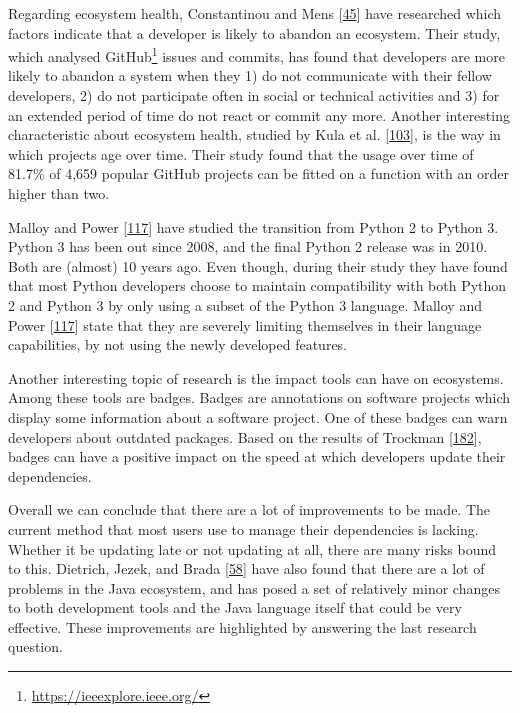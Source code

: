 \documentclass[]{book}
\let\rmarkdownfootnote\footnote%
\def\footnote{\protect\rmarkdownfootnote}
\begin{document}
Regarding ecosystem health, Constantinou and Mens
{[}\protect\hyperlink{ref-Constantinou2017}{45}{]} have researched which
factors indicate that a developer is likely to abandon an ecosystem.
Their study, which analysed GitHub\footnote{\url{https://ieeexplore.ieee.org/}}
issues and commits, has found that developers are more likely to abandon
a system when they 1) do not communicate with their fellow developers,
2) do not participate often in social or technical activities and 3) for
an extended period of time do not react or commit any more. Another
interesting characteristic about ecosystem health, studied by Kula et
al. {[}\protect\hyperlink{ref-Kula2017-2}{103}{]}, is the way in which
projects age over time. Their study found that the usage over time of
81.7\% of 4,659 popular GitHub projects can be fitted on a function with
an order higher than two.

Malloy and Power {[}\protect\hyperlink{ref-Malloy2018}{117}{]} have
studied the transition from Python 2 to Python 3. Python 3 has been out
since 2008, and the final Python 2 release was in 2010. Both are
(almost) 10 years ago. Even though, during their study they have found
that most Python developers choose to maintain compatibility with both
Python 2 and Python 3 by only using a subset of the Python 3 language.
Malloy and Power {[}\protect\hyperlink{ref-Malloy2018}{117}{]} state
that they are severely limiting themselves in their language
capabilities, by not using the newly developed features.

Another interesting topic of research is the impact tools can have on
ecosystems. Among these tools are badges. Badges are annotations on
software projects which display some information about a software
project. One of these badges can warn developers about outdated
packages. Based on the results of Trockman
{[}\protect\hyperlink{ref-Trockman2018}{182}{]}, badges can have a
positive impact on the speed at which developers update their
dependencies.

Overall we can conclude that there are a lot of improvements to be made.
The current method that most users use to manage their dependencies is
lacking. Whether it be updating late or not updating at all, there are
many risks bound to this. Dietrich, Jezek, and Brada
{[}\protect\hyperlink{ref-Dietrich2014}{58}{]} have also found that
there are a lot of problems in the Java ecosystem, and has posed a set
of relatively minor changes to both development tools and the Java
language itself that could be very effective. These improvements are
highlighted by answering the last research question.
\end{document}
